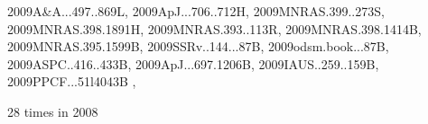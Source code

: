 \documentclass[12pt]{article}
\begin{document}
\begin{description}
{2009A&A...497..869L,%
2009ApJ...706..712H,%
2009MNRAS.399..273S,%
2009MNRAS.398.1891H,%
2009MNRAS.393..113R,%
2009MNRAS.398.1414B,%
2009MNRAS.395.1599B,%
2009SSRv..144...87B,%
2009odsm.book...87B,%
2009ASPC..416..433B,%
2009ApJ...697.1206B,%
2009IAUS..259..159B,%
2009PPCF...51l4043B%
},\item
28 times in 2008 \citep{
2008A&A...491L..41L,%
2008A&A...479..883L,%
2008A&A...484...29G,%
2008A&A...490..743G,%
2008arXiv0809.4949G, %
2008A&A...490..501J,%
2008ApJ...685..406W,%
2008A&A...488....9K,%
2008NewAR..52...78K,%
2008CRPhy...9..757R,%
2008A&A...486..597J,%
}
\end{description}
\end{document}
